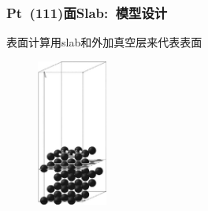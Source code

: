 \frame
{
	\frametitle{\textrm{Pt~(111)}面\textrm{Slab}:~模型设计}
表面计算用\textrm{slab}和外加真空层来代表表面
					\begin{minipage}[t]{0.60\textwidth}
\begin{figure}[h!]
\centering
\includegraphics[height=1.9in,viewport=0 0 300 580,clip]{Figures/Pt_surface.png}
\caption{\fontsize{6.2pt}{5.2pt}}%
\label{Pt_surface}
\end{figure}
					\end{minipage}
				\hfill
					\begin{minipage}[t]{0.38\textwidth}
{\fontsize{8.2pt}{5.2pt}}
					\end{minipage}
{\fontsize{6.2pt}{5.2pt}}\\%
}

